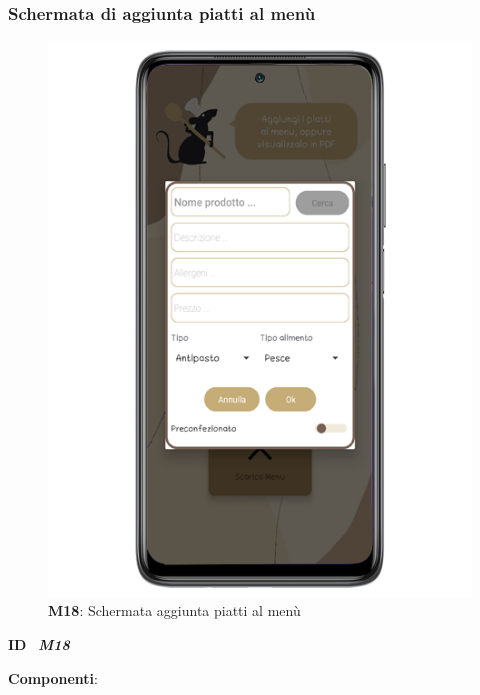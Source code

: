                     \newpage

                    \subsubsection{Schermata di aggiunta piatti al menù}
                        \begin{figure}[H]
                          \centering
                          \includegraphics[scale=2]{assets/Mockup/Mockup_AddPlate.png}
                          \caption*{\textbf{M18}: Schermata aggiunta piatti al menù}\label{fig:Mockup_AddPlate}
                        \end{figure}
              
                        \begin{flushleft}
                          \textbf{ID}   \ \Large{\textit{\textbf{M18}}}
                        \end{flushleft}
              
                        \textbf{Componenti}:
                        

